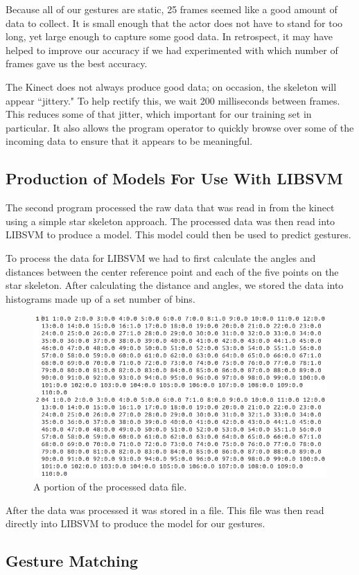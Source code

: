 \documentclass[11pt,conference]{IEEEtran}
\begin{document}
Because all of our gestures are static, 25 frames seemed like a good amount of data to collect. It is small enough that the actor does not have to stand for too long, yet large enough to capture some good data. In retrospect, it may have helped to improve our accuracy if we had experimented with which number of frames gave us the best accuracy.

The Kinect does not always produce good data; on occasion, the skeleton will appear ``jittery." To help rectify this, we wait 200 milliseconds between frames. This reduces some of that jitter, which important for our training set in particular. It also allows the program operator to quickly browse over some of the incoming data to ensure that it appears to be meaningful.

\subsection{Production of Models For Use With LIBSVM}
The second program processed the raw data that was read in from the kinect using a simple star skeleton approach. The processed data was then read into LIBSVM to produce a model. This model could then be used to predict gestures.

To process the data for LIBSVM we had to first calculate the angles and distances between the center reference point and each of the five points on the star skeleton. After calculating the distance and angles, we stored the data into histograms made up of a set number of bins.

\begin{figure}[h]
\caption{A portion of the processed data file.}
\centering
\includegraphics[width=\linewidth]{processed_data}
\end{figure}

After the data was processed it was stored in a file. This file was then read directly into LIBSVM to produce the model for our gestures. 

\subsection{Gesture Matching}
\end{document}

